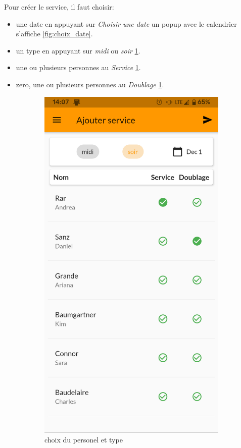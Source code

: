     Pour créer le service, il faut choisir:
    \begin{itemize}
        \item une date en appuyant sur \textit{Choisir une date} un popup avec le calendrier s'affiche \ref{fig:choix_date}.
        \item un type en appuyant sur \textit{midi} ou \textit{soir} \ref{fig:ajout_service_c}. 
        \item une ou plusieurs personnes au \textit{Service} \ref{fig:ajout_service_c}.
        \item zero, une ou plusieurs personnes au \textit{Doublage} \ref{fig:ajout_service_c}.
    \end{itemize}
    \begin{figure}[!h]
        \centering
        \begin{subfigure}{.45\textwidth}
            \centering
            \includegraphics[width=0.6\linewidth]{screenshots/scenario_05/ajout_service_c.png}
            \caption{choix du personel et type}
            \label{fig:ajout_service_c}
        \end{subfigure}
        \begin{subfigure}{.45\textwidth}

\end{subfigure}
\end{figure}
